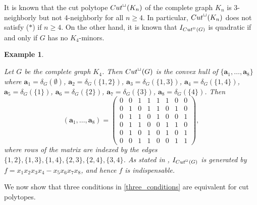 \documentclass[10pt,a4paper]{amsart}
\newtheorem{example}[thm]{Example}
\numberwithin{thm}{section}
\numberwithin{equation}{section}
\def\ab{{\mathbf a}}
\begin{document}
    It is known {\cite[Section 4.2]{Z}} that 
    the cut polytope
    ${\rm Cut}^\Box(K_n)$ of the complete graph $K_n$ is 3-neighborly but not 4-neighborly 
    for all $n\ge 4$.
    In particular, ${\rm Cut}^\Box(K_n)$ does not satisfy ($*$) if $n \ge 4$.
    On the other hand, it is known \cite{Eng} that $I_{{\rm Cut}^\Box(G)}$ is quadratic if and only if $G$ has no $K_4$-minors.

\begin{example}\label{k4}

    Let $G$ be the complete graph $K_4$.
    Then ${\rm Cut}^\Box(G)$ is the convex hull of $\{\ab_1, \dots, \ab_8\}$ where
    $\ab_1 = \delta_G(\emptyset)$, $\ab_2 = \delta_G(\{1,2\})$, $\ab_3 = \delta_G(\{1,3\})$, $\ab_4 = \delta_G(\{1,4\})$, $\ab_5 = \delta_G(\{1\})$, $\ab_6 = \delta_G(\{2\})$, $\ab_7 = \delta_G(\{3\})$, $\ab_8 = \delta_G(\{4\})$.
    Then
    \[
    (\ab_1, \dots, \ab_8) = 
    \left(
    \begin{array}{cccccccc}
    0 & 0 & 1 & 1 & 1 & 1 & 0 & 0\\
    0 & 1 & 0 & 1 & 1 & 0 & 1 & 0\\
    0 & 1 & 1 & 0 & 1 & 0 & 0 & 1\\
    0 & 1 & 1 & 0 & 0 & 1 & 1 & 0\\
    0 & 1 & 0 & 1 & 0 & 1 & 0 & 1\\
    0 & 0 & 1 & 1 & 0 & 0 & 1 & 1
    \end{array}
    \right),
    \]
    where rows of the matrix are indexed by the edges $
    \{1,2\},\{1,3\},\{1,4\},\{2,3\},\{2,4\},\{3,4\}$.
    As stated in \cite[Example 1.1]{SS}, $I_{{\rm Cut}^\Box(G)}$ is generated by $f=x_1x_2x_3x_4 - x_5x_6x_7x_8$, and hence $f$ is indispensable.
\end{example}


We now show that three conditions in \eqref{three_conditions} are equivalent for cut polytopes.
\end{document}
